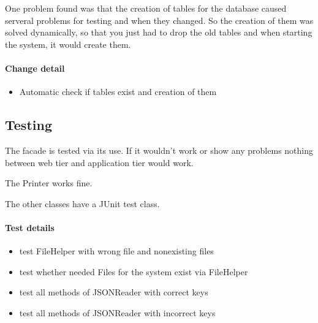 One problem found was that the creation of tables for the database caused serveral problems
for testing and when they changed. So the creation of them was solved dynamically, so
that you just had to drop the old tables and when starting the system, it would
create them.

\paragraph{Change detail}
\begin{itemize}
  \item Automatic check if tables exist and creation of them
\end{itemize}


\subsection{Testing}
The facade is tested via its use. If it wouldn't work or show any problems
nothing between web tier and application tier would work.

The Printer works fine.

The other classes have a JUnit test class.
\paragraph{Test details}
\begin{itemize}
  \item test FileHelper with wrong file and nonexisting files
  \item test whether needed Files for the system exist via FileHelper
  \item test all methods of JSONReader with correct keys
  \item test all methods of JSONReader with incorrect keys
\end{itemize}




